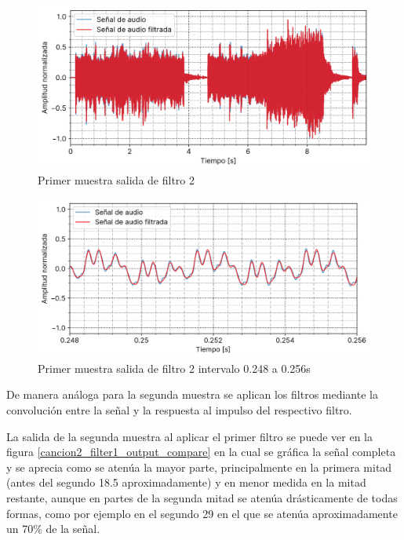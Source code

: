 \documentclass[12pt]{article}
\begin{document}
\begin{figure}[H]
\centering
\includegraphics{plot/cancion1_filter2_output_compare.png}
\caption{Primer muestra salida de filtro 2}
\label{cancion1_filter2_output_compare}
\end{figure}

\begin{figure}[H]
\centering
\includegraphics{plot/cancion1_filter2_output_compare_0_248_a_0_256.png}
\caption{Primer muestra salida de filtro 2 intervalo 0.248 a 0.256s}
\label{cancion1_filter2_output_compare_0_248_a_0_256}
\end{figure}

\pagebreak

De manera análoga para la segunda muestra se aplican los filtros mediante la
convolución entre la señal y la respuesta al impulso del respectivo filtro.

La salida de la segunda muestra al aplicar el primer filtro se puede ver en la
figura \ref{cancion2_filter1_output_compare} en la cual se gráfica la señal
completa y se aprecia como se atenúa la mayor parte, principalmente en la
primera mitad (antes del segundo 18.5 aproximadamente) y en menor medida en
la mitad restante, aunque en partes de la segunda mitad se atenúa drásticamente
de todas formas, como por ejemplo en el segundo 29 en el que se atenúa
aproximadamente un 70\% de la señal.
\end{document}
